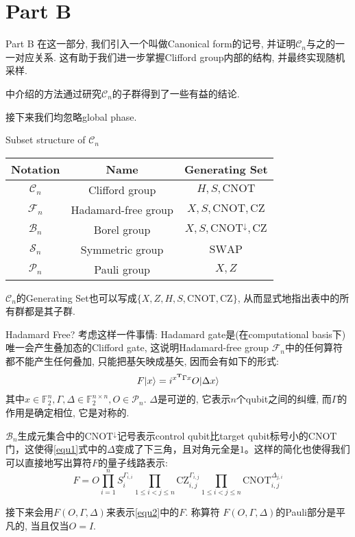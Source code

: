 \documentclass{beamer}
\def \ket#1{|#1 \rangle}
\begin{document}
\section{Part B}
\begin{frame}{Part B}
	在这一部分, 我们引入一个叫做Canonical form的记号, 并证明$\mathcal C_n$与之的一一对应关系. 这有助于我们进一步掌握Clifford group内部的结构, 并最终实现随机采样.
	
	\cite{paper1}中介绍的方法通过研究$\mathcal C_n$的子群得到了一些有益的结论. 
	
	接下来我们均忽略global phase.
\end{frame}
\begin{frame}{Subset structure of $\mathcal C_n$}
	\begin{center}
	\begin{tabular}{c|c|c}
		Notation & Name & Generating Set\\
		\hline
		$\mathcal C_n$ & Clifford group & $H, S, \mathrm{CNOT}$\\
		\hline
		$\mathcal F_n$ & Hadamard-free group & $X, S, \mathrm{CNOT}, \mathrm{CZ}$\\
		\hline
		$\mathcal B_n$ & Borel group & $X, S, \mathrm{CNOT}^{\downarrow}, \mathrm{CZ}$\\
		\hline
		$\mathcal S_n$ & Symmetric group & $\mathrm{SWAP}$\\
		\hline
		$\mathcal P_n$ & Pauli group & $X, Z$\\
	\end{tabular}
	\end{center}
$\mathcal C_n$的Generating Set也可以写成$\{X, Z, H, S, \mathrm{CNOT}, \mathrm{CZ}\}$, 从而显式地指出表中的所有群都是其子群.
\end{frame}
\begin{frame}{Hadamard Free?}
	考虑这样一件事情: Hadamard gate是(在computational basis下)唯一会产生叠加态的Clifford gate, 这说明Hadamard-free group $\mathcal F_n$中的任何算符都不能产生任何叠加, 只能把基矢映成基矢, 因而会有如下的形式:\pause
\begin{equation}
F\ket{x} = i^{x^{\textbf T}\Gamma x}O\ket{\Delta x}
\label{equ1}
\end{equation}	
	其中$x \in \mathbb F_2^{n}, \Gamma, \Delta \in \mathbb F_2^{n \times n}, O \in \mathcal P_n$. $\Delta$是可逆的, 它表示$n$个qubit之间的纠缠, 而$\Gamma$的作用是确定相位, 它是对称的.\pause
	
	$\mathcal B_n$生成元集合中的$\mathrm{CNOT}^{\downarrow}$记号表示control qubit比target qubit标号小的$\mathrm{CNOT}$门，这使得\cref{equ1}式中的$\Delta$变成了下三角，且对角元全是$1$。这样的简化也使得我们可以直接地写出算符$F$的量子线路表示:\pause
	\begin{equation}
	F = O\prod_{i=1}^{n}S_i^{\Gamma_{i, i}}\prod_{1 \le i < j \le n}\mathrm{CZ}_{i, j}^{\Gamma_{i, j}} \prod_{1 \le i < j \le n}\mathrm{CNOT}_{i, j}^{\Delta_{j, i}}
	\label{equ2}
	\end{equation}
	
	接下来会用$F(O, \Gamma, \Delta)$来表示\cref{equ2}中的$F$. 称算符 $F(O, \Gamma, \Delta)$的Pauli部分是平凡的, 当且仅当$O = I$.
	
\end{frame}
\end{document}
